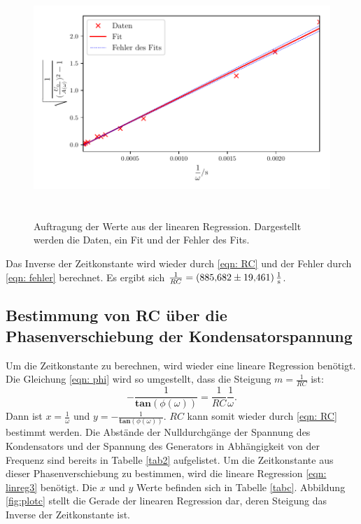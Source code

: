 \begin{figure}
  \centering
  \includegraphics[width=13cm, height=9cm]{build/plotb.pdf}
  \caption{Auftragung der Werte aus der linearen Regression. Dargestellt werden die Daten, ein Fit und der Fehler des Fits.}
  \label{fig:plotb}
\end{figure}

\noindent Das Inverse der Zeitkonstante wird wieder durch \eqref{eqn: RC} und der Fehler durch \eqref{eqn: fehler}
berechnet. Es ergibt sich $\frac{1}{RC} = \SI[per-mode=fraction]{885.682  \pm 19.461}{\per\second}$.

\subsection{Bestimmung von RC über die Phasenverschiebung der Kondensatorspannung}
\label{sec: c}
Um die Zeitkonstante zu berechnen, wird wieder eine lineare Regression benötigt.
Die Gleichung \eqref{eqn: phi} wird so umgestellt, dass die Steigung $m = \frac{1}{RC}$ ist:
\begin{equation}
    -\frac{1}{\mathbf{tan}(\phi(\omega))} = \frac{1}{RC} \frac{1}{\omega}.
    \label{eqn: linreg3} 
\end{equation}
Dann ist $x= \frac{1}{\omega}$ und $y= -\frac{1}{\mathbf{tan}(\phi(\omega))}$.
$RC$ kann somit wieder durch \eqref{eqn: RC} bestimmt werden.
\newline
Die Abstände der Nulldurchgänge der Spannung des Kondensators und der Spannung des Generators in Abhängigkeit
von der Frequenz sind bereits in Tabelle \ref{tab2} aufgelistet.
Um die Zeitkonstante aus dieser Phasenverschiebung zu bestimmen, wird die lineare Regression \eqref{eqn: linreg3} benötigt.
Die $x$ und $y$ Werte befinden sich in Tabelle \ref{tabc}. Abbildung \ref{fig:plotc} stellt die Gerade der
linearen Regression dar, deren Steigung das Inverse der Zeitkonstante ist.


